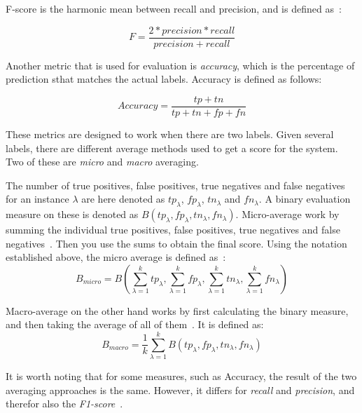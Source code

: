 F-score is the harmonic mean between recall and precision, and is defined as~\cite{tjong2003introduction}:

\begin{equation}
    F = \frac{2*precision*recall}{precision+recall}
\end{equation}

Another metric that is used for evaluation is \textit{accuracy}, which is the percentage of prediction sthat matches the actual labels.
Accuracy is defined as follows:

\begin{equation}
    Accuracy = \frac{tp+tn}{tp+tn+fp+fn}
\end{equation}

These metrics are designed to work when there are two labels.
Given several labels, there are different average methods used to get a score for the system.
Two of these are \textit{micro} and \textit{macro} averaging.

The number of true positives, false positives, true negatives and false negatives for an instance $\lambda$ are here denoted as $tp_\lambda$, $fp_\lambda$, $tn_\lambda$ and $fn_\lambda$.
A binary evaluation measure on these is denoted as $B(tp_\lambda, fp_\lambda, tn_\lambda, fn_\lambda)$.
Micro-average work by summing the individual true positives, false positives, true negatives and false negatives~\cite{tsoumakas2009mining}.
Then you use the sums to obtain the final score.
Using the notation established above, the micro average is defined as~\cite{tsoumakas2009mining}:
\begin{equation}
    B_{micro} = B(\sum_{\lambda = 1}^ktp_\lambda, \sum_{\lambda = 1}^kfp_\lambda, \sum_{\lambda = 1}^ktn_\lambda, \sum_{\lambda = 1}^kfn_\lambda)
\end{equation}

Macro-average on the other hand works by first calculating the binary measure, and then taking the average of all of them~\cite{tsoumakas2009mining}.
It is defined as:
\begin{equation}
    B_{macro} = \frac{1}{k}\sum_{\lambda = 1}^kB(tp_\lambda, fp_\lambda, tn_\lambda, fn_\lambda)
\end{equation}

It is worth noting that for some measures, such as Accuracy, the result of the two averaging approaches is the same.
However, it differs for \textit{recall} and \textit{precision}, and therefor also the \textit{F1-score}~\cite{tsoumakas2009mining}.

